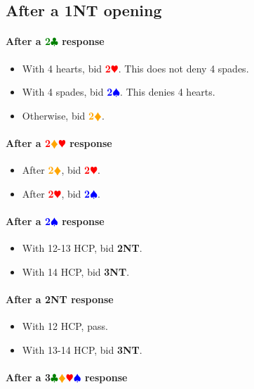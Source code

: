\documentclass{article}
\newcommand{\Hs}{\textcolor{Red}{$\varheart$}}
\newcommand{\Ss}{\textcolor{Blue}{$\spadesuit$}}
\newcommand{\Ds}{\textcolor{Orange}{$\vardiamond$}}
\newcommand{\Cs}{\textcolor{Green}{$\clubsuit$}}
\newcommand{\NTs}{\textbf{\footnotesize{NT}}}
\renewcommand{\H}[1]{\textcolor{Red}{\textbf{#1}\Hs}}
\renewcommand{\S}[1]{\textcolor{Blue}{\textbf{#1}\Ss}}
\newcommand{\D}[1]{\textcolor{Orange}{\textbf{#1}\Ds}}
\newcommand{\C}[1]{\textcolor{Green}{\textbf{#1}\Cs}}
\newcommand{\NT}[1]{\textbf{#1\NTs}}
\newcommand{\suits}[1]{\textbf{#1}\Cs\Ds\Hs\Ss}
\newcommand{\reds}[1]{\textcolor{Red}{\textbf{#1}}\Ds\Hs}
\begin{document}
\subsection{After a \NT{1} opening}

\paragraph{After a \C{2} response}

\begin{itemize}
\item With 4 hearts, bid \H{2}. This does not deny 4 spades.
\item With 4 spades, bid \S{2}. This denies 4 hearts.
\item Otherwise, bid \D{2}.
\end{itemize}

\paragraph{After a \reds{2}  response}

\begin{itemize}
\item After \D{2}, bid \H{2}.
\item After \H{2}, bid \S{2}.
\end{itemize}

\paragraph{After a \S{2} response}

\begin{itemize}
\item With 12-13 HCP, bid \NT{2}.
\item With 14 HCP, bid \NT{3}.
\end{itemize}

\paragraph{After a \NT{2} response}

\begin{itemize}
\item With 12 HCP, pass.
\item With 13-14 HCP, bid \NT{3}.
\end{itemize}

\paragraph{After a \suits{3} response}
\end{document}
